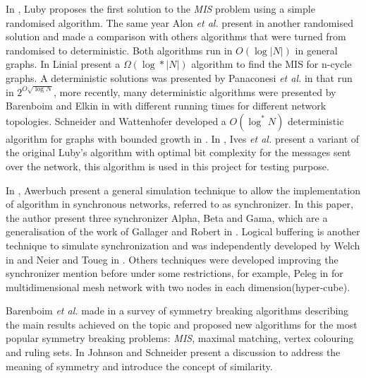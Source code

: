 In \cite{luby1986simple}, Luby proposes the first solution to the \textit{MIS} problem using a simple randomised algorithm. The same year Alon \textit{et al.} present in \cite{alon1986fast} another randomised solution and made a comparison with others algorithms that were turned from randomised to deterministic. Both algorithms run in $O(\log |N|)$ in general graphs. In \cite{linial1992locality} Linial present a $\Omega(\log* |N|)$ algorithm to find the MIS for n-cycle graphs. A deterministic solutions was presented by Panaconesi \textit{et al.} in \cite{panconesi1996complexity} that run in $2^{O\sqrt{\log N}}$, more recently, many deterministic algorithms were presented by Barenboim and Elkin in \cite{barenboim2010sublogarithmic} with different running times for different network topologies. Schneider and Wattenhofer developed a $O(\log^* N)$ deterministic algorithm for graphs with bounded growth in \cite{barenboim2010sublogarithmic}. In \cite{yves2009optimal}, Ives \textit{et al.} present a variant of the original Luby's algorithm with optimal bit complexity for the messages sent over the network, this algorithm is used in this project for testing purpose.

 

In \cite{awerbuch1985complexity}, Awerbuch present a general simulation technique to allow the implementation of algorithm in synchronous networks, referred to as synchronizer. In this paper, the author present three synchronizer Alpha, Beta and Gama, which are a generalisation of the work of Gallager and Robert in \cite{gallager1982distributed}. Logical buffering is another technique to simulate synchronization and was independently developed by Welch in \cite{welch1987simulating} and Neier and Toueg in \cite{neiger1993simulating}. Others techniques were developed improving the synchronizer mention before under some restrictions, for example, Peleg in \cite{peleg1989optimal} for multidimensional mesh network with two nodes in each dimension(hyper-cube).

 Barenboim \textit{et al.} made in \cite{barenboim2016locality} a survey of symmetry breaking algorithms describing the main results achieved on the topic and proposed new algorithms for the most popular symmetry breaking problems: \textit{MIS}, maximal matching, vertex colouring and ruling sets. In \cite{johnson1985symmetry} Johnson and Schneider present a discussion to address the meaning of symmetry and introduce the concept of similarity.  
\newline